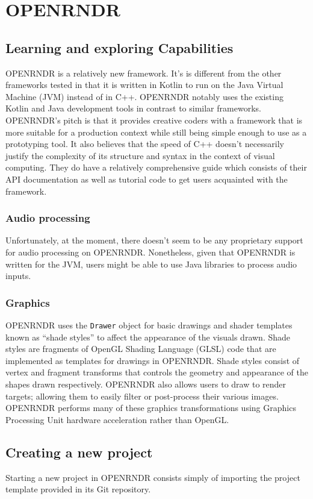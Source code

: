 \documentclass[../main_frameworkreview.tex]{subfiles}
\begin{document}
\section{OPENRNDR}

\subsection{Learning and exploring Capabilities}
OPENRNDR is a relatively new framework. It's is different from the other frameworks tested in that it is written in Kotlin to run on the Java Virtual Machine (JVM) instead of in C++. OPENRNDR notably uses the existing Kotlin and Java development tools in contrast to similar frameworks. OPENRNDR's pitch is that it provides creative coders with a framework that is more suitable for a production context while still being simple enough to use as a prototyping tool. It also believes that the speed of C++ doesn't necessarily justify the complexity of its structure and syntax in the context of visual computing.\cite{ORMedium} They do have a relatively comprehensive guide which consists of their API documentation as well as tutorial code to get users acquainted with the framework.\cite{ORGuide}
\subsubsection{Audio processing}
Unfortunately, at the moment, there doesn't seem to be any proprietary support for audio processing on OPENRNDR. Nonetheless, given that OPENRNDR is written for the JVM, users might be able to use Java libraries to process audio inputs.
\subsubsection{Graphics}
OPENRNDR uses the \verb|Drawer| object for basic drawings and shader templates known as ``shade styles'' to affect the appearance of the visuals drawn. Shade styles are fragments of OpenGL Shading Language (GLSL) code that are implemented as templates for drawings in OPENRNDR. Shade styles consist of vertex and fragment transforms that controls the geometry and appearance of the shapes drawn respectively.\cite{ORshadestylestut} OPENRNDR also allows users to draw to render targets; allowing them to easily filter or post-process their various images. OPENRNDR performs many of these graphics transformations using Graphics Processing Unit hardware acceleration rather than OpenGL.\cite{ORMedium}

\subsection{Creating a new project}
Starting a new project in OPENRNDR consists simply of importing the project template provided in its Git repository.
\end{document}
